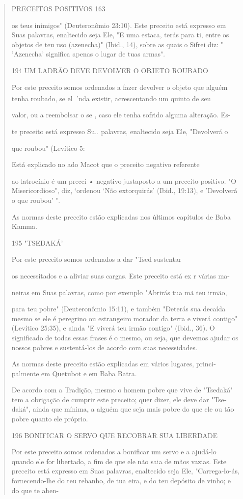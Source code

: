 \begin{quote}
PRECEITOS POSITIVOS 163

os teus inimigos" (Deuteronômio 23:10). Este preceito está expresso em
Suas palavras, enaltecido seja Ele, "E uma estaca, terás para ti, entre
os objetos de teu uso (azenecha)" (Ibid., 14), sobre as quais o Sifrei
diz: " 'Azenecha' signifi­ca apenas o lugar de tuas armas".

194 UM LADRÃO DEVE DEVOLVER O OBJETO ROUBADO

Por este preceito somos ordenados a fazer devolver o objeto que alguém
tenha roubado, se el\textsuperscript{-} 'nda existir, acrescentando um
quinto de seu

valor, ou a reembolsar o se , caso ele tenha sofrido alguma alteração.
Es-

te preceito está expresso Su.. palavras, enaltecido seja Ele, "Devolverá
o

que roubou" (Levítico 5:

Está explicado no ado Macot que o preceito negativo referente

ao latrocínio é um precei • negativo justaposto a um preceito positivo.
"O Mi­sericordioso", diz, `ordenou `Não extorquirás' (Ibid., 19:13), e
'Devolverá o que roubou' ".

As normas deste preceito estão explicadas nos últimos capítulos de Baba
Kamma.

195 "TSEDAKÁ'

Por este preceito somos ordenados a dar "Tsed sustentar

os necessitados e a aliviar suas cargas. Este preceito está ex r várias
ma-

neiras em Suas palavras, como por exemplo "Abrirás tua mã teu irmão,

para teu pobre" (Deuteronômio 15:11), e também "Deterás sua decaída
mes­mo se ele é peregrino ou estrangeiro morador da terra e viverá
contigo" (Leví­tico 25:35), e ainda "E viverá teu irmão contigo" (Ibid.,
36). O significado de todas essas frases é o mesmo, ou seja, que devemos
ajudar os nossos pobres e sustentá-los de acordo com suas necessidades.

As normas deste preceito estão explicadas em vários lugares,
princi­palmente em Quetubot e em Baba Batra.

De acordo com a Tradição, mesmo o homem pobre que vive de "Tse­daká" tem
a obrigação de cumprir este preceito; quer dizer, ele deve dar
"Tse­daká", ainda que mínima, a alguém que seja mais pobre do que ele ou
tão po­bre quanto ele próprio.

196 BONIFICAR O SERVO QUE RECOBRAR SUA LIBERDADE

Por este preceito somos ordenados a bonificar um servo e a ajudá-lo
quando ele for libertado, a fim de que ele não saia de mãos vazias. Este
preceito está expresso em Suas palavras, enaltecido seja Ele,
"Carrega-lo-ás, fornecendo-lhe do teu rebanho, de tua eira, e do teu
depósito de vinho; e do que te aben-
\end{quote}

